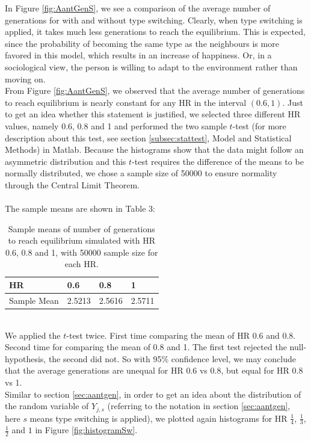 In Figure \ref{fig:AantGenS}, we see a comparison of the average number of generations for with and without type switching. 
Clearly, when type switching is applied, it takes much less generations to reach the equilibrium. 
This is expected, since the probability of becoming the same type as the neighbours is more favored in this model, which results in an increase of happiness. 
Or, in a sociological view, the person is willing to adapt to the environment rather than moving on.\\

From Figure \ref{fig:AantGenS}, we observed that the average number of generations to reach equilibrium is nearly constant for any HR in the interval \((0.6,1)\). 
Just to get an idea whether this statement is justified, we selected three different HR values, namely 0.6, 0.8 and 1 and performed the two sample \(t\)-test (for more description about this test, see section \ref{subsec:stattest}, Model and Statistical Methods) in Matlab. Because the histograms show that the data might follow an asymmetric distribution and this \(t\)-test requires the difference of the means to be normally distributed, we chose a sample size of 50000 to ensure normality through the Central Limit Theorem.\\
\\
The sample means are shown in Table 3:
\begin{table}[htp]
\centering
\caption{Sample means of number of generations to reach equilibrium simulated with HR 0.6, 0.8 and 1, with 50000 sample size for each HR.}
\begin{tabular}{|l|l|l|l|}
\hline
 HR&0.6&0.8&1 \\ \hline
 Sample Mean&2.5213&2.5616&2.5711  \\ \hline 
\end{tabular}
\end{table}
\\
We applied the \(t\)-test twice. First time comparing the mean of HR 0.6 and 0.8. Second time for comparing the mean of 0.8 and 1. The first test rejected the null-hypothesis, the second did not. So with 95\% confidence level, we may conclude that the average generations are unequal for HR 0.6 vs 0.8, but equal for HR 0.8 vs 1.\\
\newpage
Similar to section \ref{sec:aantgen}, in order to get an idea about the distribution of the random variable of $Y_{j,s}$ (referring to the notation in section \ref{sec:aantgen}, here \(s\) means type switching is applied), we plotted again histograms for HR $\frac{1}{4}$, $\frac{1}{3}$, $\frac{1}{2}$ and $1$ in Figure \ref{fig:histogramSw}.

